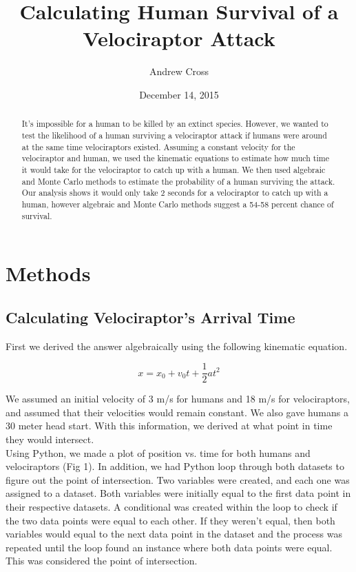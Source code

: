 \documentclass[twocolumn]{revtex4}
\begin{document}
\title{
Calculating Human Survival of a Velociraptor Attack
}

\author{Andrew Cross}

\date{December 14, 2015}

\begin{abstract}
    It's impossible for a human to be killed by an extinct species.
    However, we wanted to test the likelihood of a human surviving
    a velociraptor attack if humans were around at the same time
    velociraptors existed. Assuming a constant velocity for the velociraptor and human, we used the kinematic equations to estimate how much time it would take for the velociraptor to catch up with a human. We then used algebraic and Monte Carlo methods to estimate the probability of a human surviving the attack. Our analysis shows it would only take 2 seconds for a velociraptor to catch up with a human, however algebraic and Monte Carlo methods suggest a 54-58 percent chance of survival.
\end{abstract}

\maketitle

\section{Methods}
\subsection{Calculating Velociraptor's Arrival Time}
First we derived the answer algebraically using the following kinematic equation.

$$x = x_0 + v_0 t + \frac{1}{2} a t^2$$

We assumed an initial velocity of 3 m/s for humans and 18 m/s for velociraptors, and assumed that their velocities would remain constant. We also gave humans a 30 meter head start. With this information, we derived at what point in time they would intersect.\\

Using Python, we made a plot of position vs. time for both humans and velociraptors (Fig 1). In addition, we had Python loop through both datasets to figure out the point of intersection. Two variables were created, and each one was assigned to a dataset. Both variables were initially equal to the first data point in their respective datasets. A conditional was created within the loop to check if the two data points were equal to each other. If they weren't equal, then both variables would equal to the next data point in the dataset and the process was repeated until the loop found an instance where both data points were equal. This was considered the point of intersection.
\end{document}
